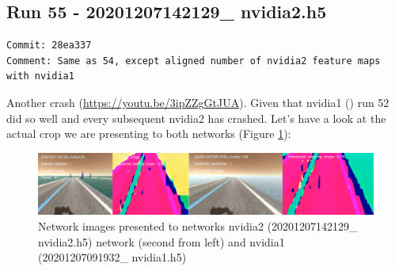\subsection{Run 55 - 20201207142129\_ nvidia2.h5}
\begin{verbatim}
Commit: 28ea337
Comment: Same as 54, except aligned number of nvidia2 feature maps with nvidia1
\end{verbatim}
Another crash (\url{https://youtu.be/3ipZZgGtJUA}). Given that nvidia1 () run 52 did so well and every subsequent nvidia2 has crashed. Let's have a look at the actual crop we are presenting to both networks (Figure \ref{fig:2129x1932crops}):
 
\begin{figure}[ht]
 \centering 
 \includegraphics[width=\textwidth]{Figures/2129x1932crops.png}
 \caption{Network images presented to networks nvidia2 (20201207142129\_ nvidia2.h5) network (second from left) and nvidia1 (20201207091932\_ nvidia1.h5)}
 \label{fig:2129x1932crops}
\end{figure}


